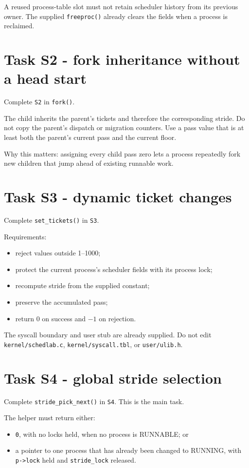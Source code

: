 \documentclass[11pt,a4paper]{article}
\newcommand{\file}[1]{\texttt{#1}}
\begin{document}
A reused process-table slot must not retain scheduler history from its previous owner. The supplied \file{freeproc()} already clears the fields when a process is reclaimed.

\section{Task S2 - fork inheritance without a head start}

Complete \file{S2} in \file{fork()}.

The child inherits the parent's tickets and therefore the corresponding stride. Do not copy the parent's dispatch or migration counters. Use a pass value that is at least both the parent's current pass and the current floor.

Why this matters: assigning every child pass zero lets a process repeatedly fork new children that jump ahead of existing runnable work.

\section{Task S3 - dynamic ticket changes}

Complete \file{set\_tickets()} in \file{S3}.

Requirements:

\begin{itemize}
\item reject values outside 1--1000;
\item protect the current process's scheduler fields with its process lock;
\item recompute stride from the supplied constant;
\item preserve the accumulated pass;
\item return 0 on success and $-1$ on rejection.
\end{itemize}

The syscall boundary and user stub are already supplied. Do not edit \file{kernel/schedlab.c}, \file{kernel/syscall.tbl}, or \file{user/ulib.h}.

\section{Task S4 - global stride selection}

Complete \file{stride\_pick\_next()} in \file{S4}. This is the main task.

The helper must return either:

\begin{itemize}
\item \file{0}, with no locks held, when no process is RUNNABLE; or
\item a pointer to one process that has already been changed to RUNNING, with \file{p->lock} held and \file{stride\_lock} released.
\end{itemize}
\end{document}
